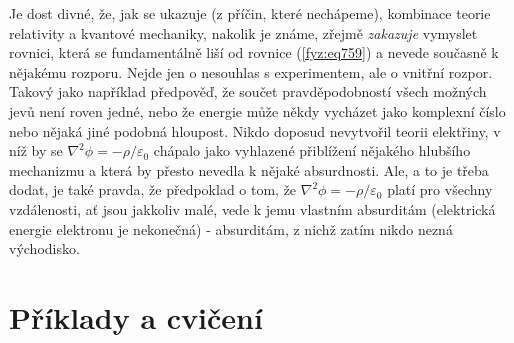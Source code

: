     Je dost divné, že, jak se ukazuje (z příčin, které nechápeme), kombinace teorie relativity a
    kvantové mechaniky, nakolik je známe, zřejmě \emph{zakazuje} vymyslet rovnici, která se
    fundamentálně liší od rovnice (\ref{fyz:eq759}) a nevede současně k nějakému rozporu. Nejde jen
    o nesouhlas s experimentem, ale o vnitřní rozpor. Takový jako například předpověď, že součet
    pravděpodobností všech možných jevů není roven jedné, nebo že energie může někdy vycházet jako
    komplexní číslo nebo nějaká jiné podobná hloupost. Nikdo doposud nevytvořil teorii elektřiny, v
    níž by se \(∇^2ϕ=−ρ/\varepsilon_0\) chápalo jako vyhlazené přiblížení nějakého hlubšího mechanizmu a která
    by přesto nevedla k nějaké absurdnosti. Ale, a to je třeba dodat, je také pravda, že předpoklad
    o tom, že \(∇^2ϕ=−ρ/\varepsilon_0\) platí pro všechny vzdálenosti, ať jsou jakkoliv malé, vede k jemu
    vlastním absurditám (elektrická energie elektronu je nekonečná) - absurditám, z nichž zatím
    nikdo nezná východisko.
  
  \section{Příklady a cvičení}\label{fyz:IIchapXIIsecVIII}